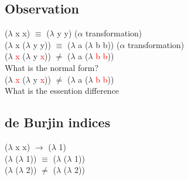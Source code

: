 \documentclass{article}
\begin{document}
\begin{flushleft}
\subsection*{Observation}
\begin{flushleft}
($\lambda$ x x) $\equiv$ ($\lambda$ y y) ($\alpha$ transformation)\\
($\lambda$ x ($\lambda$ y y)) $\equiv$ ($\lambda$ a ($\lambda$ b b)) ($\alpha$ transformation)\\
($\lambda$ \textcolor{red}{x} ($\lambda$ y \textcolor{red}{x})) $\neq$ ($\lambda$ a ($\lambda$ \textcolor{red}{b} \textcolor{red}{b}))\\
 \doublespacing
What is the normal form?\\
($\lambda$ \textcolor{red}{x} ($\lambda$ y \textcolor{red}{x})) $\neq$ ($\lambda$ a ($\lambda$ \textcolor{red}{b} \textcolor{red}{b}))\\
What is the essention difference
\end{flushleft}

\subsection*{de Burjin indices}
\begin{flushleft}
($\lambda$ x x) $\rightarrow$ ($\lambda$ 1)\\
($\lambda$ ($\lambda$ 1)) $\equiv$ ($\lambda$ ($\lambda$ 1))\\
($\lambda$ ($\lambda$ 2)) $\neq$ ($\lambda$ ($\lambda$ 2))
\end{flushleft}
\end{flushleft}
\end{document}
